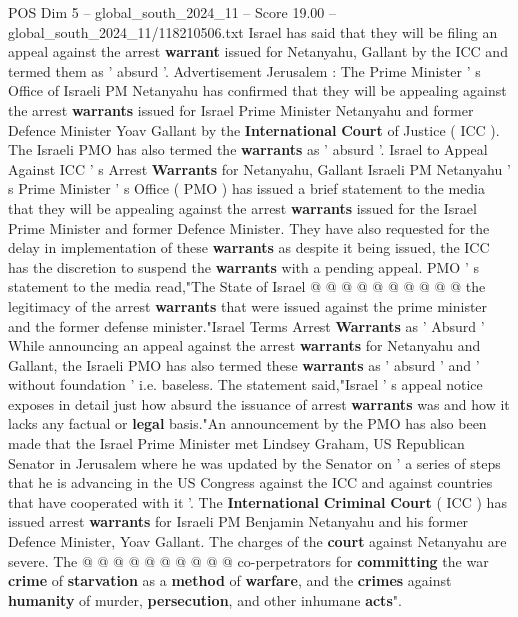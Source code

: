 \begin{textsample}{POS Dim 5 – global\_south\_2024\_11 – Score 19.00 – global\_south\_2024\_11/118210506.txt}  \label{ex:f5_pos_028}
Israel has said that they will be filing an appeal against the arrest \textbf{warrant} issued for Netanyahu, Gallant by the ICC and termed them as ' absurd '.
Advertisement Jerusalem : The Prime Minister ' s Office of Israeli PM Netanyahu has confirmed that they will be appealing against the arrest \textbf{warrants} issued for Israel Prime Minister Netanyahu and former Defence Minister Yoav Gallant by the \textbf{International} \textbf{Court} of Justice ( ICC ).
The Israeli PMO has also termed the \textbf{warrants} as ' absurd '.
Israel to Appeal Against ICC ' s Arrest \textbf{Warrants} for Netanyahu, Gallant Israeli PM Netanyahu ' s Prime Minister ' s Office ( PMO ) has issued a brief statement to the media that they will be appealing against the arrest \textbf{warrants} issued for the Israel Prime Minister and former Defence Minister.
They have also requested for the delay in implementation of these \textbf{warrants} as despite it being issued, the ICC has the discretion to suspend the \textbf{warrants} with a pending appeal.
PMO ' s statement to the media read,"The State of Israel @ @ @ @ @ @ @ @ @ @ the legitimacy of the arrest \textbf{warrants} that were issued against the prime minister and the former defense minister."Israel Terms Arrest \textbf{Warrants} as ' Absurd ' While announcing an appeal against the arrest \textbf{warrants} for Netanyahu and Gallant, the Israeli PMO has also termed these \textbf{warrants} as ' absurd ' and ' without foundation ' i.e. baseless.
The statement said,"Israel ' s appeal notice exposes in detail just how absurd the issuance of arrest \textbf{warrants} was and how it lacks any factual or \textbf{legal} basis."An announcement by the PMO has also been made that the Israel Prime Minister met Lindsey Graham, US Republican Senator in Jerusalem where he was updated by the Senator on ' a series of steps that he is advancing in the US Congress against the ICC and against countries that have cooperated with it '.
The \textbf{International} \textbf{Criminal} \textbf{Court} ( ICC ) has issued arrest \textbf{warrants} for Israeli PM Benjamin Netanyahu and his former Defence Minister, Yoav Gallant.
The charges of the \textbf{court} against Netanyahu are severe.
The @ @ @ @ @ @ @ @ @ @ co-perpetrators for \textbf{committing} the war \textbf{crime} of \textbf{starvation} as a \textbf{method} of \textbf{warfare}, and the \textbf{crimes} against \textbf{humanity} of murder, \textbf{persecution}, and other inhumane \textbf{acts}".

\end{textsample}
